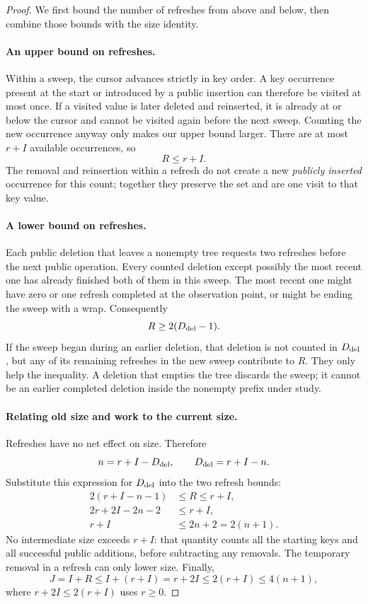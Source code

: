 \documentclass[11pt,a4paper]{article}
\theoremstyle{readable}
\begin{document}
\begin{proof}
We first bound the number of refreshes from above and below, then
combine those bounds with the size identity.

\paragraph{An upper bound on refreshes.}
Within a sweep, the cursor advances strictly in key order. A key
occurrence present at the start or introduced by a public insertion
can therefore be visited at most once. If a visited value is later
deleted and reinserted, it is already at or below the cursor and
cannot be visited again before the next sweep. Counting the new
occurrence anyway only makes our upper bound larger. There are at
most $r+I$ available occurrences, so
\[
  R\le r+I.
\]
The removal and reinsertion within a refresh do not create a new
\emph{publicly inserted} occurrence for this count; together they
preserve the set and are one visit to that key value.

\paragraph{A lower bound on refreshes.}
Each public deletion that leaves a nonempty tree requests two
refreshes before the next public operation. Every counted deletion
except possibly the most recent one has already finished both of
them in this sweep. The most recent one might have zero or one
refresh completed at the observation point, or might be ending the
sweep with a wrap. Consequently
\[
  R\ge2(D_{\rm del}-1).
\]
If the sweep began during an earlier deletion, that deletion is not
counted in $D_{\rm del}$, but any of its remaining refreshes in the
new sweep contribute to $R$. They only help the inequality. A
deletion that empties the tree discards the sweep; it cannot be an
earlier completed deletion inside the nonempty prefix under study.

\paragraph{Relating old size and work to the current size.}
Refreshes have no net effect on size. Therefore
\[
  n=r+I-D_{\rm del},\qquad D_{\rm del}=r+I-n.
\]
Substitute this expression for $D_{\rm del}$ into the two refresh
bounds:
\begin{align*}
  2(r+I-n-1)&\le R\le r+I,\\
  2r+2I-2n-2&\le r+I,\\
  r+I&\le2n+2=2(n+1).
\end{align*}
No intermediate size exceeds $r+I$: that quantity counts all the
starting keys and all successful public additions, before subtracting
any removals. The temporary removal in a refresh can only lower size.
Finally,
\[
  J=I+R\le I+(r+I)=r+2I
      \le2(r+I)\le4(n+1),
\]
where $r+2I\le2(r+I)$ uses $r\ge0$.\qedhere
\end{proof}
\end{document}
